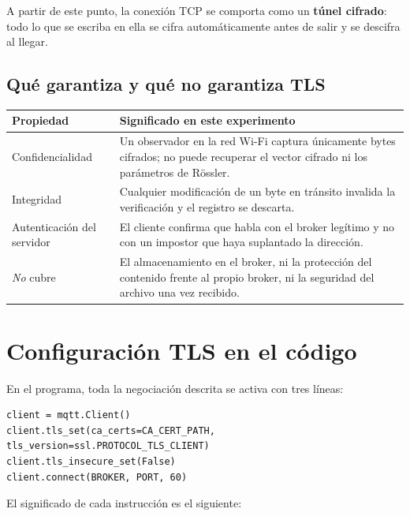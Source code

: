 \documentclass[12pt,a4paper]{article}
\begin{document}
A partir de este punto, la conexión TCP se comporta como un \textbf{túnel cifrado}: todo lo que se escriba en ella se cifra automáticamente antes de salir y se descifra al llegar.

\subsection{Qué garantiza y qué no garantiza TLS}

\begin{center}
\begin{tabularx}{0.95\textwidth}{@{}l X@{}}
\toprule
\textbf{Propiedad} & \textbf{Significado en este experimento} \\
\midrule
Confidencialidad & Un observador en la red Wi-Fi captura únicamente bytes cifrados; no puede recuperar el vector cifrado ni los parámetros de Rössler. \\
Integridad & Cualquier modificación de un byte en tránsito invalida la verificación y el registro se descarta. \\
Autenticación del servidor & El cliente confirma que habla con el broker legítimo y no con un impostor que haya suplantado la dirección. \\
\midrule
\textit{No} cubre & El almacenamiento en el broker, ni la protección del contenido frente al propio broker, ni la seguridad del archivo una vez recibido. \\
\bottomrule
\end{tabularx}
\end{center}

\section{Configuración TLS en el código}

En el programa, toda la negociación descrita se activa con tres líneas:

\begin{lstlisting}[caption={Activación de TLS antes de conectar}]
client = mqtt.Client()
client.tls_set(ca_certs=CA_CERT_PATH, tls_version=ssl.PROTOCOL_TLS_CLIENT)
client.tls_insecure_set(False)
client.connect(BROKER, PORT, 60)
\end{lstlisting}

El significado de cada instrucción es el siguiente:
\end{document}
